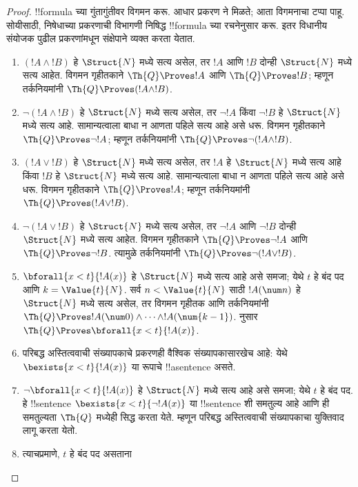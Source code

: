 \documentclass[../../../include/open-logic-section]{subfiles}
\begin{document}
\begin{proof}
!!{formula} च्या गुंतागुंतीवर विगमन करू.
%
आधार प्रकरण  ने
मिळते; आता विगमनाचा टप्पा पाहू. सोयीसाठी,
निषेधाच्या प्रकरणाची विभागणी निषिद्ध !!{formula}
च्या रचनेनुसार करू. इतर विधानीय संयोजक पुढील
प्रकरणांमधून संक्षेपाने व्यक्त करता येतात.

\begin{enumerate}
\item $(!A \land !B)$ हे $\Struct{N}$ मध्ये सत्य
असेल, तर $!A$ आणि $!B$ दोन्ही $\Struct{N}$ मध्ये सत्य आहेत.
विगमन गृहीतकाने
$\Th{Q} \Proves !A$ आणि
$\Th{Q} \Proves !B$; म्हणून तर्कनियमांनी
$\Th{Q} \Proves (!A \land !B)$.
%
\item $\lnot (!A \land !B)$ हे $\Struct{N}$
मध्ये सत्य असेल, तर $\lnot !A$ किंवा
$\lnot !B$ हे $\Struct{N}$ मध्ये सत्य आहे. सामान्यत्वाला बाधा
न आणता पहिले सत्य आहे असे धरू.
विगमन गृहीतकाने $\Th{Q} \Proves \lnot !A$;
म्हणून तर्कनियमांनी
$\Th{Q} \Proves \lnot (!A \land !B)$.
%
\item $(!A \lor !B)$ हे $\Struct{N}$ मध्ये सत्य
असेल, तर $!A$ हे $\Struct{N}$ मध्ये सत्य आहे किंवा
$!B$ हे $\Struct{N}$ मध्ये सत्य आहे.
सामान्यत्वाला बाधा न आणता पहिले सत्य आहे
असे धरू. विगमन गृहीतकाने
$\Th{Q} \Proves !A$;
म्हणून तर्कनियमांनी
$\Th{Q} \Proves (!A \lor !B)$.
%
\item $\lnot(!A \lor !B)$ हे $\Struct{N}$
मध्ये सत्य असेल, तर $\lnot !A$ आणि
$\lnot !B$ दोन्ही $\Struct{N}$ मध्ये सत्य आहेत.
विगमन गृहीतकाने
$\Th{Q} \Proves \lnot !A$ आणि
$\Th{Q} \Proves \lnot !B$.
त्यामुळे तर्कनियमांनी
$\Th{Q} \Proves \lnot(!A \lor !B)$.
%
\item $\bforall{x<t}{!A(x)}$ हे
$\Struct{N}$ मध्ये सत्य आहे असे समजा;
येथे $t$ हे बंद पद आणि $k=\Value{t}{N}$.
सर्व $n < \Value{t}{N}$ साठी
$!A(\num n)$ हे $\Struct{N}$ मध्ये सत्य
असेल, तर विगमन गृहीतक आणि तर्कनियमांनी
$\Th{Q} \Proves
!A(\num 0) \land \dots \land !A(\num{k-1})$.
 नुसार
$\Th{Q} \Proves \bforall{x<t}{!A(x)}$.
%
\item परिबद्ध अस्तित्ववाची संख्यापकाचे
प्रकरणही वैश्विक संख्यापकासारखेच आहे:
येथे $\bexists{x < t}{!A(x)}$ या रूपाचे
!!a{sentence} असते.
%
\item $\lnot \bforall{x<t}{!A(x)}$ हे
$\Struct{N}$ मध्ये सत्य आहे असे समजा;
येथे $t$ हे बंद पद. हे !!{sentence}
$\bexists{x<t}{\lnot !A(x)}$ या !!{sentence}
शी समतुल्य आहे आणि ही समतुल्यता
$\Th{Q}$ मध्येही सिद्ध करता येते. म्हणून
परिबद्ध अस्तित्ववाची संख्यापकाचा युक्तिवाद
लागू करता येतो.
%
\item त्याचप्रमाणे, $t$ हे बंद पद असताना

\end{enumerate}
\end{proof}
\end{document}
